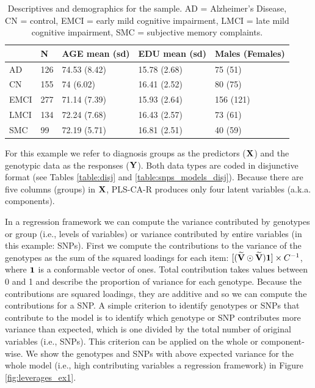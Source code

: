 \documentclass[12pt]{article}
\begin{document}
\begin{table}[!h]

\caption{\label{tab:sample_descriptives}\label{table:desctab} Descriptives and demographics for the sample. AD = Alzheimer's Disease, CN = control, EMCI = early mild cognitive impairment, LMCI = late mild cognitive impairment, SMC = subjective memory complaints.}
\centering
\begin{tabular}[t]{lllll}
\toprule
  & N & AGE mean (sd) & EDU mean (sd) & Males (Females)\\
\midrule
AD & 126 & 74.53 (8.42) & 15.78 (2.68) & 75 (51)\\
CN & 155 & 74 (6.02) & 16.41 (2.52) & 80 (75)\\
EMCI & 277 & 71.14 (7.39) & 15.93 (2.64) & 156 (121)\\
LMCI & 134 & 72.24 (7.68) & 16.43 (2.57) & 73 (61)\\
SMC & 99 & 72.19 (5.71) & 16.81 (2.51) & 40 (59)\\
\bottomrule
\end{tabular}
\end{table}

For this example we refer to diagnosis groups as the predictors
(\({\bf X}\)) and the genotypic data as the responses (\({\bf Y}\)).
Both data types are coded in disjunctive format (see Tables
\ref{table:disj} and \ref{table:snps_models_disj}). Because there are
five columns (groups) in \({\bf X}\), PLS-CA-R produces only four latent
variables (a.k.a. components).

In a regression framework we can compute the variance contributed by
genotypes or group (i.e., levels of variables) or variance contributed
by entire variables (in this example: SNPs). First we compute the
contributions to the variance of the genotypes as the sum of the squared
loadings for each item:
\([(\widetilde{\bf V} \odot \widetilde{\bf V}){\bf 1}] \times C^{-1}\),
where \({\bf 1}\) is a conformable vector of ones. Total contribution
takes values between 0 and 1 and describe the proportion of variance for
each genotype. Because the contributions are squared loadings, they are
additive and so we can compute the contributions for a SNP. A simple
criterion to identify genotypes or SNPs that contribute to the model is
to identify which genotype or SNP contributes more variance than
expected, which is one divided by the total number of original variables
(i.e., SNPs). This criterion can be applied on the whole or
component-wise. We show the genotypes and SNPs with above expected
variance for the whole model (i.e., high contributing variables a
regression framework) in Figure \ref{fig:leverages_ex1}.
\end{document}
